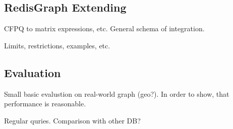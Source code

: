\subsection{RedisGraph Extending}

CFPQ to matrix expressions, etc. General schema of integration.

Limits, restrictions, examples, etc.

\subsection{Evaluation}

Small basic evalustion on real-world graph (geo?).
In order to show, that performance is reasonable.

Regular quries. Comparison with other DB?